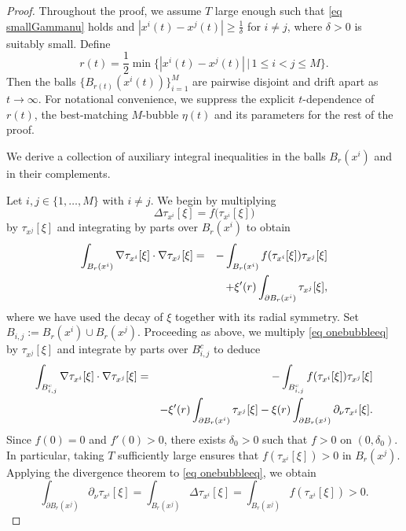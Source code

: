 \documentclass[11pt,letterpaper,reqno]{amsart}
\theoremstyle{plain}%
\theoremstyle{definition}
\numberwithin{equation}{section}
\numberwithin{figure}{section}
\begin{document}
\begin{proof}

\medskip

  Throughout the proof, we assume $T$ large enough such that \eqref{eq smallGammanu} holds and $|x^i(t)-x^j(t)| \geq \frac{1}{\delta}$ for $i\neq j$, where $\delta>0$ is suitably small. Define
\begin{equation}\label{eq defr}
    r(t)=\frac{1}{2}\min\{|x^i(t)-x^j(t)| \, |\, 1\leq i<j\leq M\}.
\end{equation} 
Then the balls $\{B_{r(t)}(x^i(t))\}_{i=1}^M$ are pairwise disjoint and drift apart as $t \to \infty$. For notational convenience, we suppress the explicit $t$-dependence of $r(t)$, the best-matching $M$-bubble $\eta(t)$ and its parameters for the rest of the proof.

\medskip

 We derive a collection of auxiliary integral inequalities in the balls $B_r(x^i)$ and in their complements.

\medskip

Let $i,j \in \{1,\dots,M\}$ with $i \neq j$.
We begin by multiplying
\begin{equation}\label{eq onebubbleeq}
\Delta \tau_{x^i}[\xi] = f\big(\tau_{x^i}[\xi]\big)
\end{equation}
by $\tau_{x^j}[\xi]$ and integrating by parts over $B_r(x^i)$ to obtain
\begin{eqnarray}\notag
\int_{B_r(x^i)} \nabla \tau_{x^i}[\xi]\cdot \nabla \tau_{x^j}[\xi]
&=& -\int_{B_r(x^i)} f(\tau_{x^i}[\xi]) \tau_{x^j}[\xi] \label{eq weak intergrad balls}\\
&&+ \xi'(r)\int_{\partial B_r(x^i)} \tau_{x^j}[\xi],
\end{eqnarray}
where we have used the decay of $\xi$ together with its radial symmetry. Set $B_{i,j} := B_r(x^i) \cup B_r(x^j)$. Proceeding as above, we multiply \eqref{eq onebubbleeq} by $\tau_{x^j}[\xi]$ and integrate by parts over $B_{i,j}^c$ to deduce
\begin{eqnarray}\label{eq weak intergrad balls2}
\int_{B_{i,j}^c} \nabla \tau_{x^i}[\xi]\cdot \nabla \tau_{x^j}[\xi]
&=& - \int_{B_{i,j}^c} f(\tau_{x^i}[\xi]) \tau_{x^j}[\xi] \notag\\
&&- \xi'(r)\int_{\partial B_r(x^i)} \tau_{x^j}[\xi]
- \xi(r) \int_{\partial B_r(x^j)} \partial_{\nu}\tau_{x^i}[\xi].
\end{eqnarray}
Since $f(0)=0$ and $f'(0)>0$, there exists $\delta_0>0$ such that $f>0$ on $(0,\delta_0)$. In particular, taking $T$ sufficiently large ensures that $f(\tau_{x^i}[\xi])>0$ in $B_r(x^j)$. Applying the divergence theorem to \eqref{eq onebubbleeq}, we obtain
\begin{equation}\label{eq sign f}
\int_{\partial B_r(x^j)} \partial_{\nu}\tau_{x^i}[\xi]
= \int_{B_r(x^j)} \Delta \tau_{x^i}[\xi]
= \int_{B_r(x^j)} f(\tau_{x^i}[\xi]) > 0.
\end{equation}


\end{proof}
\end{document}

